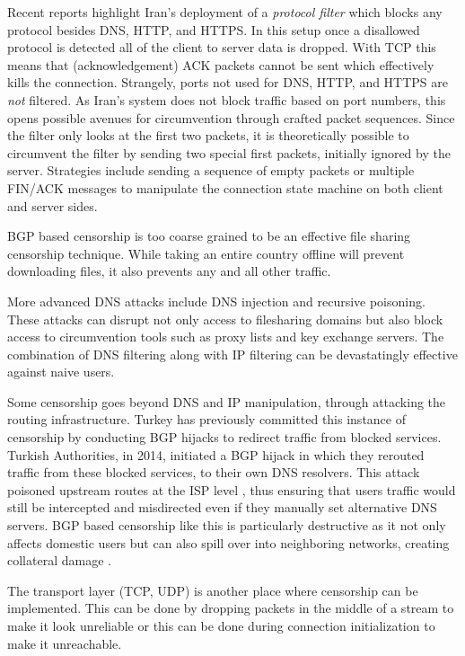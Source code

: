 Recent reports highlight Iran's deployment of a \emph{protocol filter} which blocks any
protocol besides DNS, HTTP, and HTTPS.
\cite{bockDetectingEvadingCensorshipDepth} In this setup once a disallowed
protocol is detected all of the client to server data is dropped. With TCP this
means that (acknowledgement) ACK packets cannot be sent which effectively kills the connection.
\cite[\S 4.1]{bockDetectingEvadingCensorshipDepth} Strangely, ports not used for
DNS, HTTP, and HTTPS are \emph{not} filtered. As Iran’s system does not block traffic based on port
numbers, this opens possible avenues for circumvention through crafted packet sequences.
Since the filter only looks at the first two packets, it is theoretically possible to
circumvent the filter by sending two special first packets, initially ignored by the
server. Strategies include sending a sequence of empty packets or multiple FIN/ACK messages
to manipulate the connection state machine on both client and server sides.

BGP based censorship is too coarse grained to be an effective file sharing
censorship technique. While taking an entire country offline will prevent
downloading files, it also prevents any and all other traffic.\cite[p.\@
      5]{wendzelSurveyInternetCensorship2025}

More advanced DNS attacks include DNS injection and recursive poisoning. These attacks can disrupt
not only access to filesharing domains but also block access to circumvention tools such as proxy
lists and key exchange servers. The combination of DNS filtering along with IP filtering can be
devastatingly effective against naive users.

Some censorship goes beyond DNS and IP manipulation, through attacking the
routing infrastructure. Turkey has previously committed this instance of
censorship by conducting BGP hijacks to redirect traffic from blocked services.
Turkish Authorities, in 2014, initiated a BGP hijack in which they rerouted
traffic from these blocked services, to their own DNS resolvers. This attack
poisoned upstream routes at the ISP level \cite{internetsociety2014_hijack},
thus ensuring that users traffic would still be intercepted and misdirected even
if they manually set alternative DNS servers. BGP based censorship like this is
particularly destructive as it not only affects domestic users but can also
spill over into neighboring networks, creating collateral damage
\cite{chung2017dnssec}.

The transport layer (TCP, UDP) is another place where censorship can be
implemented.\cite[p.\@ 5]{wendzelSurveyInternetCensorship2025} This can be done
by dropping packets in the middle of a stream to make it look unreliable or this
can be done during connection initialization to make it unreachable.

